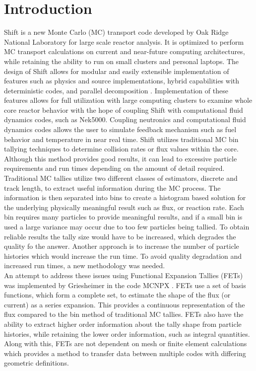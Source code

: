 \documentclass[10tma4paper]{article}
\begin{document}
\section{Introduction}\label{intro}

Shift is a new Monte Carlo (MC) transport code developed by Oak Ridge National Laboratory for large scale reactor analysis. It is optimized to perform MC transport calculations on current and near-future computing architectures, while retaining the ability to run on small clusters and personal laptops. The design of Shift allows for modular and easily extensible implementation of features such as physics and source implementations, hybrid capabilities with deterministic codes, and parallel decomposition \cite{SHIFT}. Implementation of these features allows for full utilization with large computing clusters to examine whole core reactor behavior with the hope of coupling Shift with computational fluid dynamics codes, such as Nek5000. Coupling neutronics and computational fluid dynamics codes allows the user to simulate feedback mechanism such as fuel behavior and temperature in near real time. Shift utilizes traditional MC bin tallying techniques to determine collision rates or flux values within the core. Although this method provides good results, it can lead to excessive particle requirements and run times depending on the amount of detail required.
\\
Traditional MC tallies utilize two different classes of estimators, discrete and track length, to extract useful information during the MC process. The information is then separated into bins to create a histogram based solution for the underlying physically meaningful result such as flux, or reaction rate. Each bin requires many particles to provide meaningful results, and if a small bin is used a large variance may occur due to too few particles being tallied. To obtain reliable results the tally size would have to be increased, which degrades the quality fo the answer. Another approach is to increase the number of particle histories which would increase the run time. To avoid quality degradation and increased run times, a new methodology was needed.
\\
An attempt to address these issues using Functional Expansion Tallies (FETs) was implemented by Griesheimer in the code MCNPX \cite{FETThesis}\cite{ScalarFET}. FETs use a set of basis functions, which form a complete set, to estimate the shape of the flux (or current) as a series expansion. This provides a continuous representation of the flux compared to the bin method of traditional MC tallies. FETs also have the ability to extract higher order information about the tally shape from particle histories, while retaining the lower order information, such as integral quantities. Along with this, FETs are not dependent on mesh or finite element calculations which provides a method to transfer data between multiple codes with differing geometric definitions.  
\end{document}
